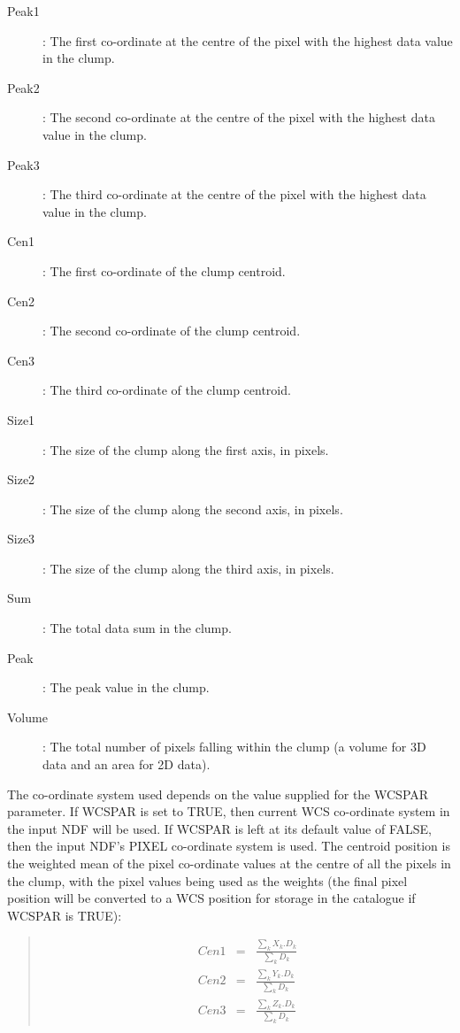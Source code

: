 \documentclass[twoside,11pt]{article}
\renewcommand{\_}{\texttt{\symbol{95}}}
\newenvironment{myquote}{\begin{quote}\begin{small}}{\end{small}\end{quote}}
\begin{document}
\begin{description}
\item[Peak1]: The first co-ordinate at the centre of the pixel with the
highest data value in the clump.
\item[Peak2]: The second co-ordinate at the centre of the pixel with the
highest data value in the clump.
\item[Peak3]: The third co-ordinate at the centre of the pixel with the
highest data value in the clump.
\item[Cen1]: The first co-ordinate of the clump centroid.
\item[Cen2]: The second co-ordinate of the clump centroid.
\item[Cen3]: The third co-ordinate of the clump centroid.
\item[Size1]: The size of the clump along the first axis, in pixels.
\item[Size2]: The size of the clump along the second axis, in pixels.
\item[Size3]: The size of the clump along the third axis, in pixels.
\item[Sum]: The total data sum in the clump.
\item[Peak]: The peak value in the clump.
\item[Volume]: The total number of pixels falling within the clump (a
volume for 3D data and an area for 2D data).
\end{description}

The co-ordinate system used depends on the value supplied for the WCSPAR
parameter. If WCSPAR is set to TRUE, then current WCS co-ordinate system
in the input NDF will be used. If WCSPAR is left at its default value of
FALSE, then the input NDF's PIXEL co-ordinate system is used. The centroid
position is the weighted mean of the pixel co-ordinate values at the centre
of all the pixels in the clump, with the pixel values being used as the
weights (the final pixel position will be converted to a WCS position for
storage in the catalogue if WCSPAR is TRUE):

\begin{myquote}
\begin{eqnarray*}
  Cen1 & = & \frac{\sum_{k}X_{k}.D_{k}}{\sum_{k}D_{k}} \\
  Cen2 & = & \frac{\sum_{k}Y_{k}.D_{k}}{\sum_{k}D_{k}} \\
  Cen3 & = & \frac{\sum_{k}Z_{k}.D_{k}}{\sum_{k}D_{k}}
\end{eqnarray*}
\end{myquote}
\end{document}
